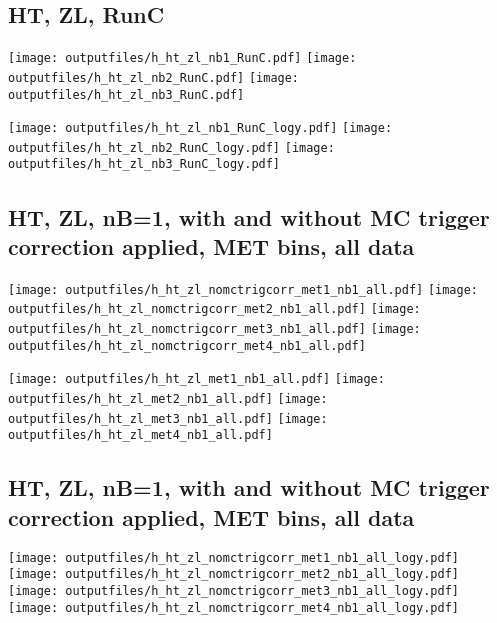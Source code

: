 \documentclass[11pt]{article}
\begin{document}
     \subsection{ HT, ZL, RunC}

    \noindent
     \texttt{[image: outputfiles/h\_ht\_zl\_nb1\_RunC.pdf]}
     \texttt{[image: outputfiles/h\_ht\_zl\_nb2\_RunC.pdf]}
     \texttt{[image: outputfiles/h\_ht\_zl\_nb3\_RunC.pdf]}

    \noindent
     \texttt{[image: outputfiles/h\_ht\_zl\_nb1\_RunC\_logy.pdf]}
     \texttt{[image: outputfiles/h\_ht\_zl\_nb2\_RunC\_logy.pdf]}
     \texttt{[image: outputfiles/h\_ht\_zl\_nb3\_RunC\_logy.pdf]}


   \clearpage



     \subsection{ HT, ZL, nB=1, with and without MC trigger correction applied, MET bins, all data}

    \noindent
     \texttt{[image: outputfiles/h\_ht\_zl\_nomctrigcorr\_met1\_nb1\_all.pdf]}
     \texttt{[image: outputfiles/h\_ht\_zl\_nomctrigcorr\_met2\_nb1\_all.pdf]}
     \texttt{[image: outputfiles/h\_ht\_zl\_nomctrigcorr\_met3\_nb1\_all.pdf]}
     \texttt{[image: outputfiles/h\_ht\_zl\_nomctrigcorr\_met4\_nb1\_all.pdf]}

    \noindent
     \texttt{[image: outputfiles/h\_ht\_zl\_met1\_nb1\_all.pdf]}
     \texttt{[image: outputfiles/h\_ht\_zl\_met2\_nb1\_all.pdf]}
     \texttt{[image: outputfiles/h\_ht\_zl\_met3\_nb1\_all.pdf]}
     \texttt{[image: outputfiles/h\_ht\_zl\_met4\_nb1\_all.pdf]}

   \clearpage
     \subsection{ HT, ZL, nB=1, with and without MC trigger correction applied, MET bins, all data}

    \noindent
     \texttt{[image: outputfiles/h\_ht\_zl\_nomctrigcorr\_met1\_nb1\_all\_logy.pdf]}
     \texttt{[image: outputfiles/h\_ht\_zl\_nomctrigcorr\_met2\_nb1\_all\_logy.pdf]}
     \texttt{[image: outputfiles/h\_ht\_zl\_nomctrigcorr\_met3\_nb1\_all\_logy.pdf]}
     \texttt{[image: outputfiles/h\_ht\_zl\_nomctrigcorr\_met4\_nb1\_all\_logy.pdf]}
\end{document}
